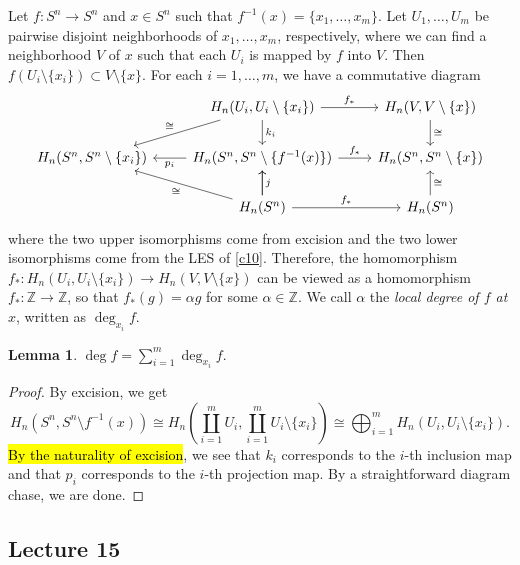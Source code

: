 \documentclass[10pt,letterpaper,cm]{nupset}
\theoremstyle{definition}
\theoremstyle{theorem}
\newtheorem{lemma}[definition]{Lemma}
\theoremstyle{remark}
\newcommand{\Z}{\mathbb Z}
\newcommand{\1}{\mathbb{1}}
\newcommand{\0}{\vec 0}
\begin{document}
\smallskip

Let $f: S^n \to S^n$ and $x\in S^n$ such that $f^{-1}(x)= \{x_1, \ldots, x_m\}$. Let $U_1, \ldots, U_m$ be pairwise disjoint neighborhoods of $x_1, \ldots, x_m$, respectively, where we can find a neighborhood $V$ of $x$ such that each $U_i$ is mapped by $f$ into $V$. Then $f(U_i \setminus \{x_i\}) \subset V \setminus \{x\}$. For each $i=1, \ldots, m$, we have a commutative diagram
\[
\begin{tikzcd}
                                 & {H_n(U_i, U_i \setminus \{x_i\})} \arrow[ld, "\cong"'] \arrow[d, "k_i"] \arrow[r, "f_{\ast}"] & {H_n(V, V\setminus \{x\})} \arrow[d, "\cong"] \\
{H_n(S^n, S^n\setminus \{x_i\})} & {H_n(S^n, S^n \setminus \{f^{-1}(x)\})} \arrow[r, "f_{\ast}"] \arrow[l, "p_i"]                & {H_n(S^n, S^n \setminus \{x\})}               \\
                                 & H_n(S^n) \arrow[lu, "\cong"] \arrow[u, "j"'] \arrow[r, "f_{\ast}"] \arrow[u]                  & H_n(S^n) \arrow[u, "\cong"']                 
\end{tikzcd}
\] where the two upper isomorphisms come from excision and the two lower isomorphisms come from the LES of \cref{c10}. Therefore, the homomorphism $f_{\ast} : H_n(U_i, U_i \setminus \{x_i\}) \to H_n(V, V\setminus \{x\})$ can be viewed as a homomorphism $f_{\ast} : \Z \to \Z$, so that $f_{\ast}(g) = \alpha g$ for some $\alpha \in \Z$. We call $\alpha$ the \textit{local degree of $f$ at $x$}, written as $\deg_{x_i}{f}$.


\begin{lemma}
$\deg{f}  = \sum_{i=1}^m \deg_{x_i}{f}$.
\end{lemma}
\begin{proof}
By excision, we get $$H_n(S^n, S^n \setminus f^{-1}(x)) \cong H_n\left(\coprod_{i=1}^m U_i,  \coprod_{i=1}^m U_i \setminus \{x_i\}\right) \cong \bigoplus_{i=1}^m H_n(U_i, U_i \setminus \{x_i\}).$$ \hl{By the naturality of excision}, we see that $k_i$ corresponds to the $i$-th inclusion map and that $p_i$ corresponds to the $i$-th projection map. By a straightforward diagram chase, we are done.
\end{proof}

\subsection{Lecture 15}
\end{document}
